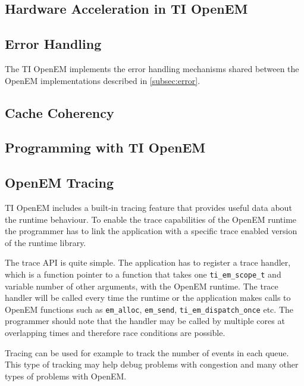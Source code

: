 \subsection{Hardware Acceleration in TI OpenEM}

\subsection{Error Handling}
The TI OpenEM implements the error handling mechanisms shared between the OpenEM implementations described in \ref{subsec:error}. 

\subsection{Cache Coherency}

\subsection{Programming with TI OpenEM}
\label{subsec:ti_init_layer}

\subsection{OpenEM Tracing}
TI OpenEM includes a built-in tracing feature that provides useful data about the runtime behaviour. To enable the trace capabilities of the OpenEM runtime the programmer has to link the application with a specific trace enabled version of the runtime library. \cite{openemapi}

The trace API is quite simple. The application has to register a trace handler, which is a function pointer to a function that takes one \texttt{ti\_em\_scope\_t} and variable number of other arguments, with the OpenEM runtime. The trace handler will be called every time the runtime or the application makes calls to OpenEM functions such as \texttt{em\_alloc}, \texttt{em\_send}, \texttt{ti\_em\_dispatch\_once} etc. \cite{openemapi} The programmer should note that the handler may be called by multiple cores at overlapping times and therefore race conditions are possible.

Tracing can be used for example to track the number of events in each queue. This type of tracking may help debug problems with congestion and many other types of problems with OpenEM.


